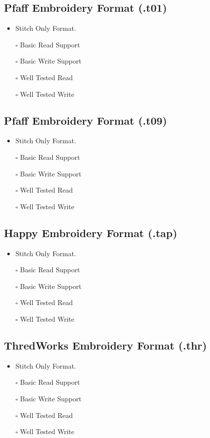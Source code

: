 \documentclass[onesize, a4paper]{refart}
\providecommand{\tightlist}{\setlength{\itemsep}{0pt}\setlength{\parskip}{0pt}}
\begin{document}
\subsection{Pfaff Embroidery Format (.t01)}

\begin{itemize}
\tightlist
\item Stitch Only Format.
\item[$\square$] Basic Read Support
\item[$\square$] Basic Write Support
\item[$\square$] Well Tested Read
\item[$\square$] Well Tested Write
\end{itemize}

\subsection{Pfaff Embroidery Format (.t09)}

\begin{itemize}
\tightlist
\item Stitch Only Format.
\item[$\square$] Basic Read Support
\item[$\square$] Basic Write Support
\item[$\square$] Well Tested Read
\item[$\square$] Well Tested Write
\end{itemize}

\subsection{Happy Embroidery Format (.tap)}

\begin{itemize}
\tightlist
\item Stitch Only Format.
\item[$\square$] Basic Read Support
\item[$\square$] Basic Write Support
\item[$\square$] Well Tested Read
\item[$\square$] Well Tested Write
\end{itemize}

\subsection{ThredWorks Embroidery Format (.thr)}

\begin{itemize}
\tightlist
\item Stitch Only Format.
\item[$\square$] Basic Read Support
\item[$\square$] Basic Write Support
\item[$\square$] Well Tested Read
\item[$\square$] Well Tested Write
\end{itemize}
\end{document}
